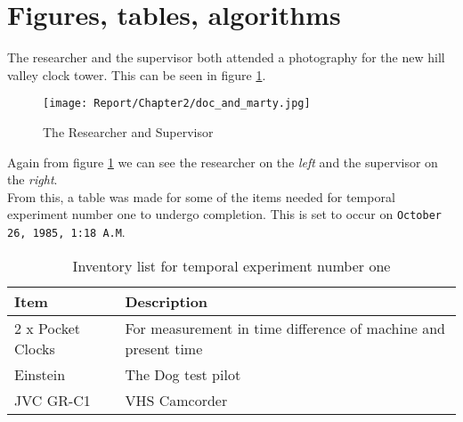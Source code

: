 \section{Figures, tables, algorithms}
\label{sec: figs tables algos}

The researcher and the supervisor both attended a photography for the new hill valley clock tower. This can be seen in figure \ref{fig:clock tower photo}.

\begin{figure}[h!]
    \centering
    \texttt{[image: Report/Chapter2/doc\_and\_marty.jpg]}
    \caption{The Researcher and Supervisor}
    \label{fig:clock tower photo}
\end{figure}

\noindent Again from figure \ref{fig:clock tower photo} we can see the researcher on the \textit{left} and the supervisor on the \textit{right}.\\

From this, a table was made for some of the items needed for temporal experiment number one to undergo completion. This is set to occur on \texttt{October 26, 1985, 1:18 A.M}.

\begin{table}[H] 
\begin{tabularx}{\textwidth}{| X | X |}
    \hline
     Item & Description  \\ \hline
     2 x Pocket Clocks & For measurement in time difference of machine and present time \\ \hline
     Einstein & The Dog test pilot \\ \hline
     JVC GR-C1 & VHS Camcorder \\ \hline
\end{tabularx}
\caption{Inventory list for temporal experiment number one}
\label{table: inventory}
\end{table}
